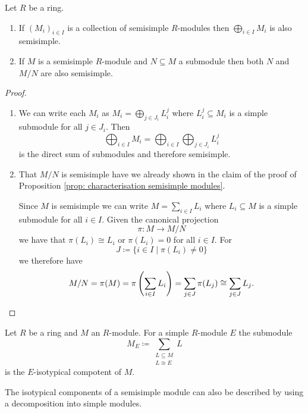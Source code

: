 \begin{lem}\label{lem: inherit semisimple}
 Let $R$ be a ring.
 \begin{enumerate}[label=\emph{\alph*})]
  \item
  If $(M_i)_{i \in I}$ is a collection of semisimple $R$-modules then $\bigoplus_{i \in I} M_i$ is also semisimple.
  \item
  If $M$ is a semisimple $R$-module and $N \subseteq M$ a submodule then both $N$ and $M/N$ are also semisimple.
 \end{enumerate}
\end{lem}
\begin{proof}
 \begin{enumerate}[label=\emph{\alph*})]
  \item
  We can write each $M_i$ as $M_i = \bigoplus_{j \in J_i} L^j_i$ where $L^j_i \subseteq M_i$ is a simple submodule for all $j \in J_i$. Then
  \[
   \bigoplus_{i \in I} M_i = \bigoplus_{i \in I} \bigoplus_{j \in J_i} L^j_i
  \]
  is the direct sum of submodules and therefore semisimple.
  \item
  That $M/N$ is semisimple have we already shown in the claim of the proof of Proposition \ref{prop: characterisation semisimple modules}.
  
  Since $M$ is semisimple we can write $M = \sum_{i \in I} L_i$ where $L_i \subseteq M$ is a simple submodule for all $i \in I$. Given the canonical projection
  \[
   \pi \colon M \to M/N
  \]
  we have that $\pi(L_i) \cong L_i$ or $\pi(L_i) = 0$ for all $i \in I$. For
  \[
   J \coloneqq \{i \in I \mid \pi(L_i) \neq 0\}
  \]
  we therefore have
  \[
   M/N = \pi(M) = \pi\left( \sum_{i \in I} L_i \right) = \sum_{j \in J} \pi(L_j) \cong \sum_{j \in J} L_j.
   \qedhere
  \]
 \end{enumerate}
\end{proof}


\begin{defi}
 Let $R$ be a ring and $M$ an $R$-module. For a simple $R$-module $E$ the submodule
 \[
  M_E \coloneqq \sum_{\substack{L \subseteq M \\ L \cong E}} L
 \]
 is the $E$-isotypical compotent of $M$.
\end{defi}


The isotypical components of a semisimple module can also be described by using a decomposition into simple modules.


